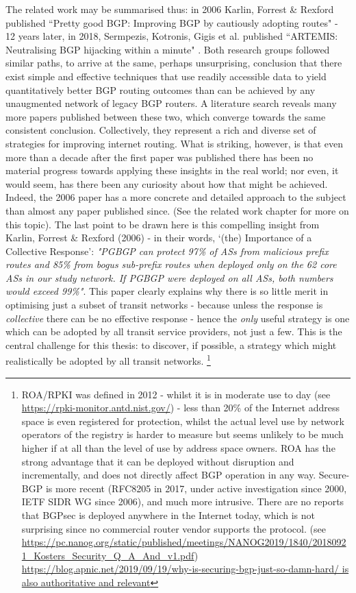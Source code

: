 The related work may be summarised thus: in 2006 Karlin, Forrest \& Rexford published ``Pretty good BGP: Improving BGP by cautiously adopting routes" \cite{Karlin2006} - 12 years later, in 2018, Sermpezis, Kotronis, Gigis et al. published ``ARTEMIS: Neutralising BGP hijacking within a minute" \cite{Sermpezis2018}.
Both research groups followed similar paths, to arrive at the same, perhaps unsurprising, conclusion that there exist simple and effective techniques that use readily accessible data to yield quantitatively better BGP routing outcomes than can be achieved by any unaugmented network of legacy BGP routers. A literature search reveals many more papers published between these two, which converge towards the same consistent conclusion.
Collectively, they represent a rich and diverse set of strategies for improving internet routing. What is striking, however, is that even more than a decade after the first paper was published there has been no material progress towards applying these insights in the real world; nor even, it would seem, has there been any curiosity about how that might be achieved.
Indeed, the 2006 paper has a more concrete and detailed approach to the subject than almost any paper published since.
(See the related work chapter for more on this topic).
The last point to be drawn here is this compelling insight from Karlin, Forrest \& Rexford (2006) - in their words, `(the) Importance of a Collective Response':
\emph{"PGBGP can protect 97\% of ASs from malicious prefix routes and 85\% from bogus sub-prefix routes when deployed only on the 62 core ASs in our study network. If PGBGP were deployed on all ASs, both numbers would exceed 99\%"}.
This paper clearly explains why there is so little merit in optimising just a subset of transit networks - because unless the response is \emph{collective} there can be no effective response - hence the \emph{only} useful strategy is one which can be adopted by all transit service providers, not just a few.
\medskip
This is the central challenge for this thesis: to discover, if possible, a strategy which might realistically be adopted by all transit networks.
\footnote {ROA/RPKI was defined in 2012 - whilst it is in moderate use to day (see \url{https://rpki-monitor.antd.nist.gov/}) - less than 20\% of the Internet address space is even registered for protection, whilst the actual level use by network operators of the registry is harder to measure but seems unlikely to be much higher if at all than the level of use by address space owners.
	ROA has the strong advantage that it can be deployed without disruption and incrementally, and does not directly affect BGP operation in any way.
	Secure-BGP is more recent (RFC8205 in 2017, under active investigation since 2000, IETF SIDR WG since 2006), and much more intrusive.
	There are no reports that BGPsec is deployed anywhere in the Internet today, which is not surprising since no commercial router vendor supports the protocol. (see \url{https://pc.nanog.org/static/published/meetings/NANOG2019/1840/20180921\_Kosters\_Security\_Q\_A\_And\_v1.pdf})  \url{https://blog.apnic.net/2019/09/19/why-is-securing-bgp-just-so-damn-hard/ is also authoritative and relevant}}
\medskip

